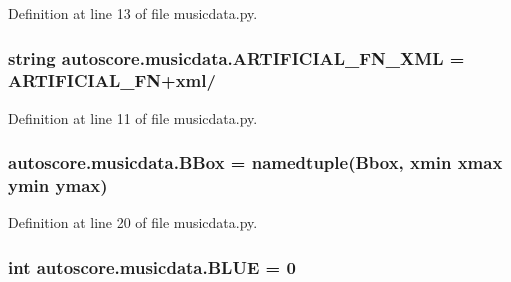 Definition at line 13 of file musicdata.\+py.

\subsubsection[{\texorpdfstring{A\+R\+T\+I\+F\+I\+C\+I\+A\+L\+\_\+\+F\+N\+\_\+\+X\+ML}{ARTIFICIAL_FN_XML}}]{\setlength{\rightskip}{0pt plus 5cm}string autoscore.\+musicdata.\+A\+R\+T\+I\+F\+I\+C\+I\+A\+L\+\_\+\+F\+N\+\_\+\+X\+ML = {\bf A\+R\+T\+I\+F\+I\+C\+I\+A\+L\+\_\+\+FN}+\textquotesingle{}xml/\textquotesingle{}}\hypertarget{namespaceautoscore_1_1musicdata_a6e0e7fa09f8f4907ed2774f39c417c8d}{}\label{namespaceautoscore_1_1musicdata_a6e0e7fa09f8f4907ed2774f39c417c8d}


Definition at line 11 of file musicdata.\+py.

\subsubsection[{\texorpdfstring{B\+Box}{BBox}}]{\setlength{\rightskip}{0pt plus 5cm}autoscore.\+musicdata.\+B\+Box = namedtuple(\textquotesingle{}Bbox\textquotesingle{}, \textquotesingle{}xmin xmax ymin ymax\textquotesingle{})}\hypertarget{namespaceautoscore_1_1musicdata_a0c7624e21c2d8b4557c7552671a2e538}{}\label{namespaceautoscore_1_1musicdata_a0c7624e21c2d8b4557c7552671a2e538}


Definition at line 20 of file musicdata.\+py.

\subsubsection[{\texorpdfstring{B\+L\+UE}{BLUE}}]{\setlength{\rightskip}{0pt plus 5cm}int autoscore.\+musicdata.\+B\+L\+UE = 0}\hypertarget{namespaceautoscore_1_1musicdata_a7373305dc96aaa767d13d24287c70269}{}\label{namespaceautoscore_1_1musicdata_a7373305dc96aaa767d13d24287c70269}


